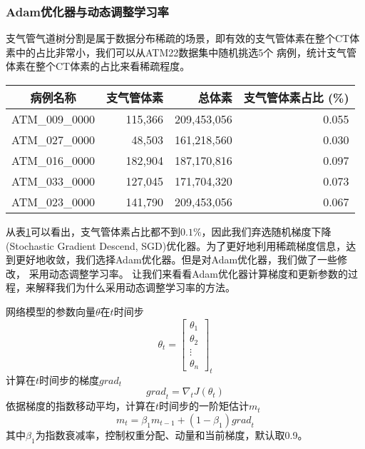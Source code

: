 \subsubsection{Adam优化器与动态调整学习率}
支气管气道树分割是属于数据分布稀疏的场景，即有效的支气管体素在整个CT体素中的占比非常小，我们可以从ATM22数据集中随机挑选5个
病例，统计支气管体素在整个CT体素的占比来看稀疏程度。
\begin{table}[!htp]
    \label{tbl:bronchus_voxels}
    \centering
    \begin{tabular}{crrr}
        \toprule
        病例名称 & 支气管体素 & 总体素 & 支气管体素占比 (\%)\\
        \midrule
        ATM\_009\_0000 &	 115,366 &	 209,453,056 &	 0.055 \\
        ATM\_027\_0000 &	 48,503  &	 161,218,560 &	 0.030 \\
        ATM\_016\_0000 &	 182,904 &	 187,170,816 &	 0.097 \\
        ATM\_033\_0000 &	 127,045 &	 171,704,320 &	 0.073 \\
        ATM\_023\_0000 &	 141,790 &	 209,453,056 &	 0.067 \\
        \bottomrule
    \end{tabular}
\end{table}
从表\ref{tbl:bronchus_voxels}可以看出，支气管体素占比都不到$0.1\%$，因此我们弃选随机梯度下降(Stochastic Gradient
Descend, SGD)优化器。为了更好地利用稀疏梯度信息，达到更好地收敛，我们选择Adam优化器。但是对Adam优化器，我们做了一些修改，
采用动态调整学习率。
让我们来看看Adam优化器\cite{Kingma2014AdamAM}计算梯度和更新参数的过程，来解释我们为什么采用动态调整学习率的方法。

\noindent{}网络模型的参数向量$\theta$在$t$时间步
\begin{equation}
\theta_{t} = \begin{bmatrix}
    \theta_{1} \\
    \theta_{2} \\
    \vdots      \\
    \theta_{n}
\end{bmatrix}_{t}
\end{equation}
计算在$t$时间步的梯度$grad_{t}$
\begin{equation}
    {grad}_{t} = \nabla_{t}J(\theta_{t})
\end{equation}
依据梯度的指数移动平均，计算在$t$时间步的一阶矩估计$m_{t}$
\begin{equation}
    m_{t} = \beta_{1} m_{t-1} + (1 - \beta_{1}) {grad}_{t}
\end{equation}
其中$\beta_{1}$为指数衰减率，控制权重分配、动量和当前梯度，默认取0.9。


